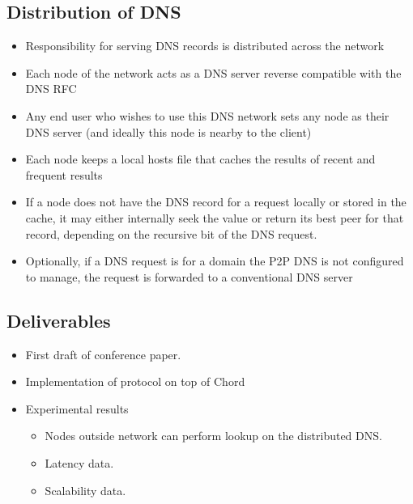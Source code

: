\documentclass{IEEEtran}
\begin{document}
\subsection{Distribution of DNS}

\begin{itemize}
\item
  Responsibility for serving DNS records is distributed across the
  network
\item
  Each node of the network acts as a DNS server reverse compatible with
  the DNS RFC
\item
  Any end user who wishes to use this DNS network sets any node as their
  DNS server (and ideally this node is nearby to the client)
\item
  Each node keeps a local hosts file that caches the results of recent
  and frequent results
\item
  If a node does not have the DNS record for a request locally or stored
  in the cache, it may either internally seek the value or return its
  best peer for that record, depending on the recursive bit of the DNS
  request.
\item
  Optionally, if a DNS request is for a domain the P2P DNS is not
  configured to manage, the request is forwarded to a conventional DNS
  server
\end{itemize}

\subsection{Deliverables}
\begin{itemize}

\item{First draft of conference paper.}
\item{Implementation of protocol on top of Chord}
\item{Experimental results}
\begin{itemize}
\item{ Nodes outside network can perform lookup on the distributed DNS.}
\item{ Latency data.}
\item{Scalability data.}
\end{itemize}
\end{itemize}
\end{document}

